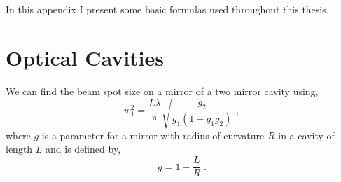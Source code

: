 In this appendix I present some basic formulas used throughout this thesis.

\section{Optical Cavities}

We can find the beam spot size on a mirror of a two mirror cavity using,
\begin{equation}
w_1^2=\frac{L\lambda}{\pi}\sqrt{\frac{g_2}{g_1\left(1-g_1g_2\right)}}\;,
\end{equation}
where $g$ is a parameter for a mirror with radius of curvature $R$ in a
cavity of length $L$ and is defined by,
\begin{equation}
g=1-\frac{L}{R}\;.
\end{equation}


